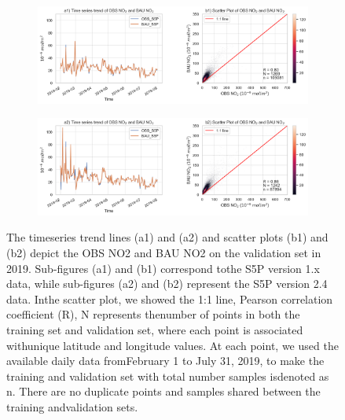 \begin{figure}[tbh!]
    \centering
    \begin{subfigure}{\textwidth}
      \centering
      \includegraphics[width=\textwidth]{figs/chap3/figA2-a1b1.png}
    \end{subfigure}

    \begin{subfigure}{\textwidth}
      \centering
      \includegraphics[width=\textwidth]{figs/chap3/figA2-a2b2.png}
    \end{subfigure}
    \caption[Model performance evaluation]{The timeseries trend lines (a1) and (a2) and scatter plots (b1) and (b2) depict the OBS NO2 and BAU NO2 on the validation set in 2019. Sub-figures (a1) and (b1) correspond tothe S5P version 1.x data, while sub-figures (a2) and (b2) represent the S5P version 2.4 data. Inthe scatter plot, we showed the 1:1 line, Pearson correlation coefficient (R), N represents thenumber of points in both the training set and validation set, where each point is associated withunique latitude and longitude values. At each point, we used the available daily data fromFebruary 1 to July 31, 2019, to make the training and validation set with total number samples isdenoted as  n. There are no duplicate points and samples shared between the training andvalidation sets.}
    \label{fig:chap3_figa2}
\end{figure}


